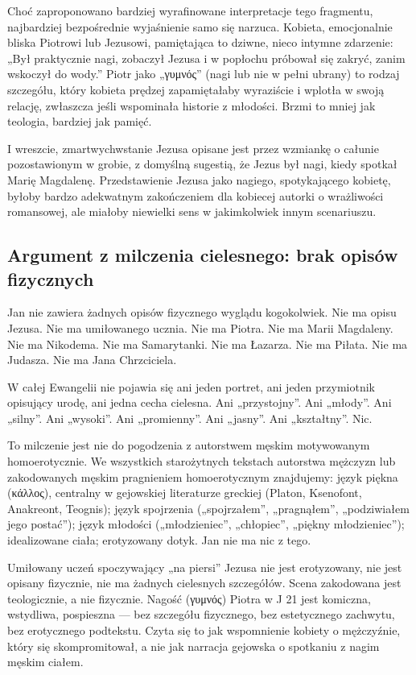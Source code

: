 Choć zaproponowano bardziej wyrafinowane interpretacje tego fragmentu, najbardziej bezpośrednie wyjaśnienie samo się narzuca.
Kobieta, emocjonalnie bliska Piotrowi lub Jezusowi, pamiętająca to dziwne, nieco intymne zdarzenie:
„Był praktycznie nagi, zobaczył Jezusa i w popłochu próbował się zakryć, zanim wskoczył do wody.”
Piotr jako „γυμνός” (nagi lub nie w pełni ubrany) to rodzaj szczegółu, który kobieta prędzej zapamiętałaby wyraziście i wplotła w swoją relację, zwłaszcza jeśli wspominała historie z młodości.
Brzmi to mniej jak teologia, bardziej jak pamięć.

I wreszcie, zmartwychwstanie Jezusa opisane jest przez wzmiankę o całunie pozostawionym w grobie, z domyślną sugestią, że Jezus był nagi, kiedy spotkał Marię Magdalenę.
Przedstawienie Jezusa jako nagiego, spotykającego kobietę, byłoby bardzo adekwatnym zakończeniem dla kobiecej autorki o wrażliwości romansowej, ale miałoby niewielki sens w jakimkolwiek innym scenariuszu.

\subsection{Argument z milczenia cielesnego: brak opisów fizycznych}\label{subsec:the-lack-of-description-of-physical-appearance-of-jesus-in-john-seems-to-contradict-the-idea-that-the-author-was-an-eyewitness-a-woman-and-a-lover-of-jesus.}

Jan nie zawiera żadnych opisów fizycznego wyglądu kogokolwiek.
Nie ma opisu Jezusa.
Nie ma umiłowanego ucznia.
Nie ma Piotra.
Nie ma Marii Magdaleny.
Nie ma Nikodema.
Nie ma Samarytanki.
Nie ma Łazarza.
Nie ma Piłata.
Nie ma Judasza.
Nie ma Jana Chrzciciela.

W całej Ewangelii nie pojawia się ani jeden portret, ani jeden przymiotnik opisujący urodę, ani jedna cecha cielesna.
Ani „przystojny”.
Ani „młody”.
Ani „silny”.
Ani „wysoki”.
Ani „promienny”.
Ani „jasny”.
Ani „kształtny”.
Nic.

To milczenie jest nie do pogodzenia z autorstwem męskim motywowanym homoerotycznie.
We wszystkich starożytnych tekstach autorstwa mężczyzn lub zakodowanych męskim pragnieniem homoerotycznym znajdujemy: język piękna (κάλλος), centralny w gejowskiej literaturze greckiej (Platon, Ksenofont, Anakreont, Teognis); język spojrzenia („spojrzałem”, „pragnąłem”, „podziwiałem jego postać”); język młodości („młodzieniec”, „chłopiec”, „piękny młodzieniec”); idealizowane ciała; erotyzowany dotyk.
Jan nie ma nic z tego.

Umiłowany uczeń spoczywający „na piersi” Jezusa nie jest erotyzowany, nie jest opisany fizycznie, nie ma żadnych cielesnych szczegółów.
Scena zakodowana jest teologicznie, a nie fizycznie.
Nagość (γυμνός) Piotra w J 21 jest komiczna, wstydliwa, pospieszna --- bez szczegółu fizycznego, bez estetycznego zachwytu, bez erotycznego podtekstu.
Czyta się to jak wspomnienie kobiety o mężczyźnie, który się skompromitował, a nie jak narracja gejowska o spotkaniu z nagim męskim ciałem.

